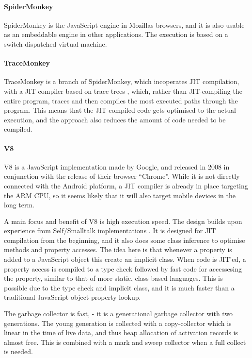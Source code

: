 \documentclass[11pt]{report}
\begin{document}
\paragraph{SpiderMonkey}
\label{spidermonkey}
SpiderMonkey \cite{spidermonkey} is the JavaScript engine in Mozillas browsers, and it is also usable as an embeddable engine in other applications. The execution is based on a switch dispatched virtual machine. %

\paragraph{TraceMonkey} 
TraceMonkey is a branch of SpiderMonkey, which incoperates JIT compilation, with a JIT compiler based on trace trees \cite{trace-tree}, 
which, rather than JIT-compiling the entire program,
traces and then compiles the most executed paths through the program.
This means that the JIT compiled code gets optimised to the actual execution,
and the approach also reduces the amount of code needed to be compiled.

\paragraph{V8} V8 \cite{v8} is a JavaScript implementation made by Google, and released in 2008 in conjunction with the release of their browser ``Chrome''. 
While it is not directly connected with the Android platform, a JIT compiler is already in place targeting the ARM CPU, so it seems likely that it will also target mobile devices in the long term.

A main focus and benefit of V8 is high execution speed.
The design builds upon experience from Self/Smalltalk implementations \cite{articles-before-v8}.
It is designed for JIT compilation from the beginning, and it also does some class inference to optimise methods and property accesses.
The idea here is that whenever a property is added to a JavaScript object this create an implicit class. When code is JIT'ed, a property access is compiled to a type check followed by fast code for accessesing the property, similar to that of more static, class based languages. This is possible due to the type check and implicit class, and it is much faster than a traditional JavaScript object property lookup.

The garbage collector is fast, - it is a generational garbage collector with two generations. The young generation is collected with a copy-collector which is linear in the time of live data, and thus heap allocation of activation records is almost free. 
This is combined with a mark and sweep collector when a full collect is needed.
\end{document}
